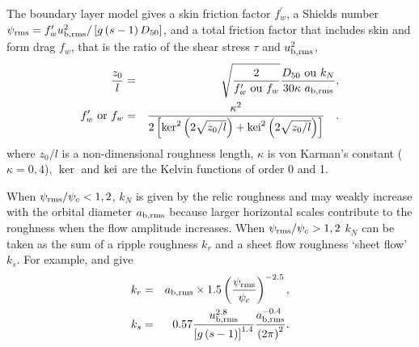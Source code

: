The boundary layer model gives a skin friction factor
$f_{w}^{\prime }$,  a Shields number  $\psi_{\rm rms} = f_{w}^{\prime
}u_{\rm b,rms}^{2}/\left[ g\left( s-1\right) D_{50}\right] $, and a total friction factor that includes skin 
and form drag  $f_{w}$, that is the ratio of the shear stress  $\tau$  and  $u_{\rm b,rms}^{2}$,
\begin{eqnarray}
\frac{z_{0}}{l} &=&\sqrt{\frac{2}{f_{w}^{\prime }{\rm~ou~}f_{w}}}\frac{D_{50}
{\rm~ou~}k_{N}}{30\kappa ~a_{\rm b,rms}},  \label{roughness to friction 1}
\\
f_{w}^{\prime }{\rm~or~}f_{w} &=&\frac{\kappa ^{2}}{2\left[ \ker
^{2}\left( 2\sqrt{z_{0}/l}\right) +{\rm kei}^{2}\left( 2\sqrt{z_{0}/l}%
\right) \right] } \quad .    \label{roughness to friction 2}
\end{eqnarray}
where  $z_{0}/l$ is a non-dimensional roughness length,  $\kappa $ is von Karman's constant ($\kappa =0,4$), 
$\ker $ and  ${\rm kei}$ are the Kelvin functions of order  0 and 1.

When  $\psi_{\rm rms} /\psi _{c}<1,2$, $k_{N}$ is given by the relic roughness and may weakly increase with 
the orbital diameter  $a_{\rm b,rms}$ because larger horizontal scales contribute to the roughness when the flow 
amplitude increases. When  $\psi_{\rm rms} /\psi _{c}>1,2$ $k_N$
can be taken as the sum of a ripple roughness $k_r$ and a sheet flow roughness
`sheet flow' $k_s$. For example, 
 \cite{Madsen&al.1990} and \cite{Wilson1989} give
\label{krandks}
\begin{eqnarray}
k_{r} &=&a_{\rm b,rms}\times 1.5\left( \frac{\psi_{\rm rms}}{\psi _{c}}\right) ^{-2.5},
 \label{kr} \\
k_{s} &=&0.57\frac{u_{\rm b,rms}^{2.8}}{\left[ g\left( s-1\right) \right] ^{1.4}}%
\frac{a_{\rm b,rms}^{-0.4}}{\left( 2\upi \right) ^{2}}.    \label{ks}
\end{eqnarray}

